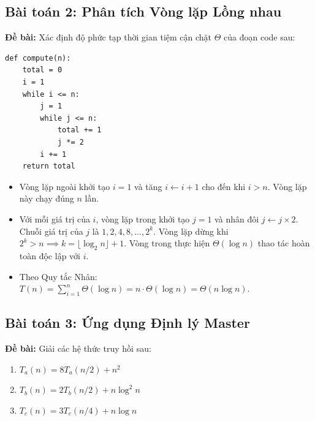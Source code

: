 \documentclass[11pt,a4paper]{article}
\begin{document}
\subsection{Bài toán 2: Phân tích Vòng lặp Lồng nhau}
\textbf{Đề bài:} Xác định độ phức tạp thời gian tiệm cận chặt $\Theta$ của đoạn code sau:
\begin{lstlisting}[style=pythonstyle]
def compute(n):
    total = 0
    i = 1
    while i <= n:
        j = 1
        while j <= n:
            total += 1
            j *= 2
        i += 1
    return total
\end{lstlisting}

\begin{definitionbox}
\begin{itemize}[itemsep=2pt]
    \item Vòng lặp ngoài khởi tạo $i = 1$ và tăng $i \leftarrow i + 1$ cho đến khi $i > n$. Vòng lặp này chạy đúng $n$ lần.
    \item Với mỗi giá trị của $i$, vòng lặp trong khởi tạo $j = 1$ và nhân đôi $j \leftarrow j \times 2$. Chuỗi giá trị của $j$ là $1, 2, 4, 8, \dots, 2^k$. Vòng lặp dừng khi $2^k > n \implies k = \lfloor \log_2 n \rfloor + 1$. Vòng trong thực hiện $\Theta(\log n)$ thao tác hoàn toàn độc lập với $i$.
    \item Theo Quy tắc Nhân: $T(n) = \sum_{i=1}^n \Theta(\log n) = n \cdot \Theta(\log n) = \Theta(n \log n)$.
\end{itemize}
\end{definitionbox}

\subsection{Bài toán 3: Ứng dụng Định lý Master}
\textbf{Đề bài:} Giải các hệ thức truy hồi sau:
\begin{enumerate}[itemsep=2pt]
    \item $T_a(n) = 8 T_a(n/2) + n^2$
    \item $T_b(n) = 2 T_b(n/2) + n \log^2 n$
    \item $T_c(n) = 3 T_c(n/4) + n \log n$
\end{enumerate}
\end{document}
